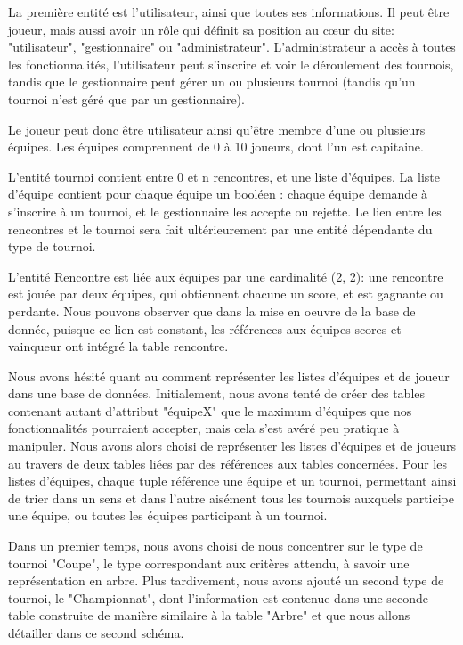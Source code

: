 \documentclass[12pt]{report}
\begin{document}
        \par
        La première entité est l'utilisateur, ainsi que toutes ses informations. Il peut être joueur, mais aussi avoir un rôle qui définit sa position au cœur du site: "utilisateur", "gestionnaire" ou "administrateur". L'administrateur a accès à toutes les fonctionnalités, l'utilisateur peut s'inscrire et voir le déroulement des tournois, tandis que le gestionnaire peut gérer un ou plusieurs tournoi (tandis qu'un tournoi n'est géré que par un gestionnaire).
        \par
	    Le joueur peut donc être utilisateur ainsi qu'être membre d'une ou plusieurs équipes. Les équipes comprennent de 0 à 10 joueurs, dont l'un est capitaine. 
	    \par
	    L'entité tournoi contient entre 0 et n rencontres, et une liste d'équipes. La liste d'équipe contient pour chaque équipe un booléen : chaque équipe demande à s'inscrire à un tournoi, et le gestionnaire les accepte ou rejette. Le lien entre les rencontres et le tournoi sera fait ultérieurement par une entité dépendante du type de tournoi.
	    \par
	    L'entité Rencontre est liée aux équipes par une cardinalité (2, 2): une rencontre est jouée par deux équipes, qui obtiennent chacune un score, et est gagnante ou perdante. Nous pouvons observer que dans la mise en oeuvre de la base de donnée, puisque ce lien est constant, les références aux équipes scores et vainqueur ont intégré la table rencontre. 
	    \par
	    Nous avons hésité quant au comment représenter les listes d'équipes et de joueur dans une base de données. Initialement, nous avons tenté de créer des tables contenant autant d'attribut "équipeX" que le maximum d'équipes que nos fonctionnalités pourraient accepter, mais cela s'est avéré peu pratique à manipuler. Nous avons alors choisi de représenter les listes d'équipes et de joueurs au travers de deux tables liées par des références aux tables concernées. Pour les listes d'équipes, chaque tuple référence une équipe et un tournoi, permettant ainsi de trier dans un sens et dans l'autre aisément tous les tournois auxquels participe une équipe, ou toutes les équipes participant à un tournoi. 
	    \par
	    Dans un premier temps, nous avons choisi de nous concentrer sur le type de tournoi "Coupe", le type correspondant aux critères attendu, à savoir une représentation en arbre. Plus tardivement, nous avons ajouté un second type de tournoi, le "Championnat", dont l'information est contenue dans une seconde table construite de manière similaire à la table "Arbre" et que nous allons détailler dans ce second schéma. 
        
\end{document}
